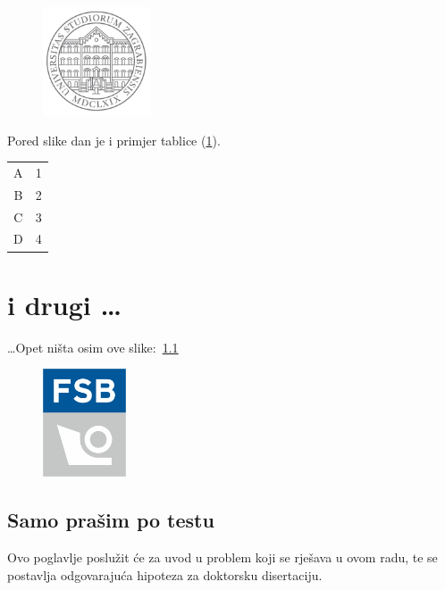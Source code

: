 \documentclass[a4paper,12pt]{report}
\begin{document}
\begin{figure}
  \centering
  \includegraphics[height=3.2cm]{unizg_sivi_t4s}\\
  \label{figa2}
\end{figure}


Pored slike dan je i primjer tablice (\ref{tablicaa}).

\begin{table}[!h]
\label{tablicaa}
  \centering
\begin{tabular}{|c c|} \hline
    A & 1 \\
    B & 2 \\
    C & 3 \\
    D & 4 \\ \hline
\end{tabular}
\end{table}

\chapter{i drugi \dots}
\dots Opet ništa osim ove slike:~\ref{dodatna}
\begin{figure}
  \centering
  \includegraphics[height=3.2cm]{fsb_logo_v}
  \label{dodatna}
\end{figure}
\newpage
\section{Samo prašim po testu}
Ovo poglavlje poslu\v{z}it \'{c}e za uvod u problem koji se rje\v{s}ava u ovom
radu, te se postavlja odgovaraju\'{c}a hipoteza za doktorsku
disertaciju.


%

\newpage
\ifpdf
\fi

\end{document}
